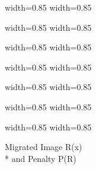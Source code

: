 \begin{frame}
      {width=0.85\textwidth} {}
      {width=0.85\textwidth} {}
\end{frame}
\begin{frame}
      {width=0.85\textwidth} {}
      {width=0.85\textwidth} {}
\end{frame}
\begin{frame}
      {width=0.85\textwidth} {}
      {width=0.85\textwidth} {}
\end{frame}
\begin{frame}
      {width=0.85\textwidth} {}
      {width=0.85\textwidth} {}
\end{frame}
\begin{frame}
      {width=0.85\textwidth} {}
      {width=0.85\textwidth} {}
\end{frame}
\begin{frame}
      {width=0.85\textwidth} {}
      {width=0.85\textwidth} {}
\end{frame}
\begin{frame}
      {width=0.85\textwidth} {}
      {width=0.85\textwidth} {}
\end{frame}

\begin{frame} 
\begin{center}
\Huge Migrated Image R(x) \\* and  Penalty P(R)
\end{center}

\end{frame}

